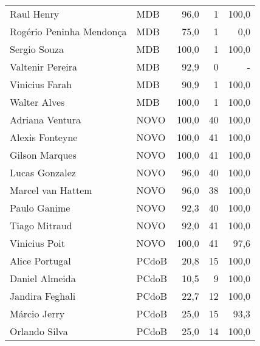 \begin{longtable}{llrrr}
                          Raul Henry &            MDB &      96,0 &            1 &      100,0 \\
            Rogério Peninha Mendonça &            MDB &      75,0 &            1 &        0,0 \\
                        Sergio Souza &            MDB &     100,0 &            1 &      100,0 \\
                    Valtenir Pereira &            MDB &      92,9 &            0 &          - \\
                      Vinicius Farah &            MDB &      90,9 &            1 &      100,0 \\
                        Walter Alves &            MDB &     100,0 &            1 &      100,0 \\
                     Adriana Ventura &           NOVO &     100,0 &           40 &      100,0 \\
                     Alexis Fonteyne &           NOVO &     100,0 &           41 &      100,0 \\
                      Gilson Marques &           NOVO &     100,0 &           41 &      100,0 \\
                      Lucas Gonzalez &           NOVO &      96,0 &           40 &      100,0 \\
                   Marcel van Hattem &           NOVO &      96,0 &           38 &      100,0 \\
                        Paulo Ganime &           NOVO &      92,3 &           40 &      100,0 \\
                       Tiago Mitraud &           NOVO &      92,0 &           41 &      100,0 \\
                       Vinicius Poit &           NOVO &     100,0 &           41 &       97,6 \\
                      Alice Portugal &          PCdoB &      20,8 &           15 &      100,0 \\
                      Daniel Almeida &          PCdoB &      10,5 &            9 &      100,0 \\
                     Jandira Feghali &          PCdoB &      22,7 &           12 &      100,0 \\
                        Márcio Jerry &          PCdoB &      25,0 &           15 &       93,3 \\
                       Orlando Silva &          PCdoB &      25,0 &           14 &      100,0 \\

\end{longtable}
